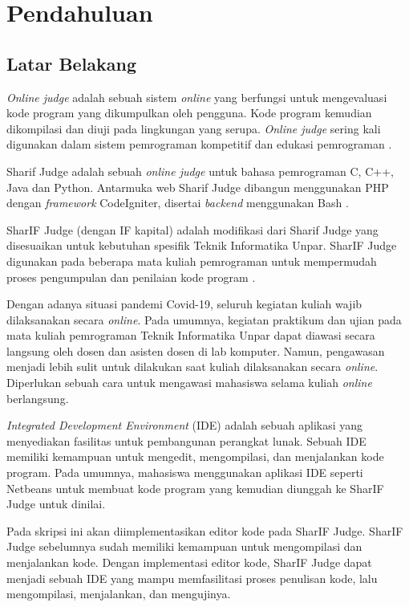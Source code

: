 \chapter{Pendahuluan}
\label{chap:intro}
   
\section{Latar Belakang}
\label{sec:label}

\textit{Online judge} adalah sebuah sistem \textit{online} yang berfungsi untuk mengevaluasi kode program yang dikumpulkan oleh pengguna. Kode program kemudian dikompilasi dan diuji pada lingkungan yang serupa. \textit{Online judge} sering kali digunakan dalam sistem pemrograman kompetitif dan edukasi pemrograman \cite{ide}.

Sharif Judge adalah sebuah \textit{online judge} untuk bahasa pemrograman C, C++, Java dan Python. Antarmuka web Sharif Judge dibangun menggunakan PHP dengan \textit{framework} CodeIgniter, disertai \textit{backend} menggunakan Bash \cite{sharif}.

SharIF Judge (dengan IF kapital) adalah modifikasi dari Sharif Judge yang disesuaikan untuk kebutuhan spesifik Teknik Informatika Unpar. SharIF Judge digunakan pada beberapa mata kuliah pemrograman untuk mempermudah proses pengumpulan dan penilaian kode program \cite{stillmen:sharif}.

Dengan adanya situasi pandemi Covid-19, seluruh kegiatan kuliah wajib dilaksanakan secara \textit{online}. Pada umumnya, kegiatan praktikum dan ujian pada mata kuliah pemrograman Teknik Informatika Unpar dapat diawasi secara langsung oleh dosen dan asisten dosen di lab komputer.  Namun, pengawasan menjadi lebih sulit untuk dilakukan saat kuliah dilaksanakan secara \textit{online}. Diperlukan sebuah cara untuk mengawasi mahasiswa selama kuliah \textit{online} berlangsung. 

{\it Integrated Development Environment} (IDE) adalah sebuah aplikasi yang menyediakan fasilitas untuk pembangunan perangkat lunak. Sebuah IDE memiliki kemampuan untuk mengedit, mengompilasi, dan menjalankan kode program. Pada umumnya, mahasiswa menggunakan aplikasi IDE seperti Netbeans untuk membuat kode program yang kemudian diunggah ke SharIF Judge untuk dinilai.

Pada skripsi ini akan diimplementasikan editor kode pada SharIF Judge. SharIF Judge sebelumnya sudah memiliki kemampuan untuk mengompilasi dan menjalankan kode. Dengan implementasi editor kode, SharIF Judge dapat menjadi sebuah IDE yang mampu memfasilitasi proses penulisan kode, lalu mengompilasi, menjalankan, dan mengujinya.

